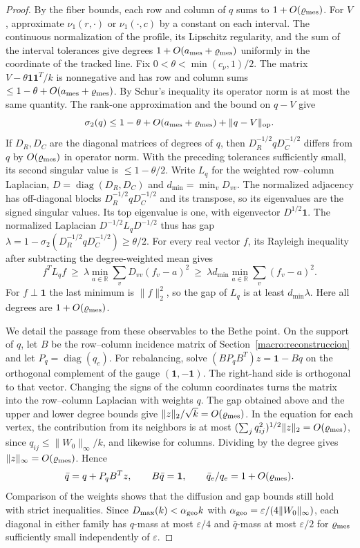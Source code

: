 \begin{proof}
By the fiber bounds, each row and column of $q$ sums to $1+O(\varrho_{\rm mes})$. For $V$, approximate
$\nu_1(r,\cdot)$ or $\nu_1(\cdot,c)$ by a constant on each interval. The continuous normalization of the
profile, its Lipschitz regularity, and the sum of the interval tolerances give degrees $1+O(a_{\rm
mes}+\varrho_{\rm mes})$ uniformly in the coordinate of the tracked line. Fix
${0<\theta<\min(c_\nu,1)/2}$. The matrix $V-\theta\mathbf1\mathbf1^T/k$ is nonnegative and has row and
column sums ${\le1-\theta+O(a_{\rm mes}+\varrho_{\rm mes})}$. By Schur's inequality its operator norm is
at most the same quantity. The rank-one approximation and the bound on $q-V$ give
\[
 \sigma_2(q)\le1-\theta+O(a_{\rm mes}+\varrho_{\rm mes})+\|q-V\|_{\rm op}.
\]
If $D_R,D_C$ are the diagonal matrices of degrees of $q$, then $D_R^{-1/2}qD_C^{-1/2}$ differs from $q$ by
$O(\varrho_{\rm mes})$ in operator norm. With the preceding tolerances sufficiently small, its second
singular value is $\le1-\theta/2$. Write $L_q$ for the weighted row--column Laplacian,
$D=\operatorname{diag}(D_R,D_C)$ and $d_{\min}=\min_v D_{vv}$. The normalized adjacency has
off-diagonal blocks $D_R^{-1/2}qD_C^{-1/2}$ and its transpose, so its eigenvalues are the signed
singular values. Its top eigenvalue is one, with eigenvector $D^{1/2}\mathbf1$. The normalized
Laplacian $D^{-1/2}L_qD^{-1/2}$ thus has gap
$\lambda=1-\sigma_2(D_R^{-1/2}qD_C^{-1/2})\ge\theta/2$. For every real vector $f$, its Rayleigh
inequality after subtracting the degree-weighted mean gives
\[
 f^TL_q f\ \ge\ \lambda\min_{a\in\mathbb R}\sum_v D_{vv}(f_v-a)^2
 \ \ge\ \lambda d_{\min}\min_{a\in\mathbb R}\sum_v(f_v-a)^2 .
\]
For $f\perp\mathbf1$ the last minimum is $\|f\|_2^2$, so the gap of $L_q$ is at least
$d_{\min}\lambda$.
Here all degrees are $1+O(\varrho_{\rm mes})$.

We detail the passage from these observables to the Bethe point. On the support of $q$, let $B$ be the
row--column incidence matrix of Section~\ref{macro:reconstruccion} and let $P_q=\operatorname{diag}(q_e)$.
For rebalancing, solve $(BP_qB^T)z=\mathbf1-Bq$ on the orthogonal complement of the gauge
$(\mathbf1,-\mathbf1)$. The right-hand side is orthogonal to that vector. Changing the signs of the column
coordinates turns the matrix into the row--column Laplacian with weights $q$. The gap obtained above
and the upper and lower degree bounds give $\|z\|_2/\sqrt{k}=O(\varrho_{\rm mes})$. In the equation
for each vertex, the contribution from its neighbors is at most
$(\sum_j q_{ij}^2)^{1/2}\|z\|_2=O(\varrho_{\rm mes})$, since $q_{ij}\le\|W_0\|_\infty/k$, and
likewise for columns. Dividing by the degree gives $\|z\|_\infty=O(\varrho_{\rm mes})$. Hence
\[
 \bar q=q+P_qB^Tz,\qquad B\bar q=\mathbf1,\qquad
 \bar q_e/q_e=1+O(\varrho_{\rm mes}).
\]
Comparison of the weights shows that the diffusion and gap bounds still hold with strict inequalities.
Since $D_{\max}(k)<\alpha_{\rm geo} k$ with $\alpha_{\rm geo}=\varepsilon/(4\|W_0\|_\infty)$, each
diagonal in either family has
$q$-mass at most $\varepsilon/4$ and $\bar q$-mass at most $\varepsilon/2$ for $\varrho_{\rm mes}$
sufficiently small independently of $\varepsilon$.


\end{proof}
